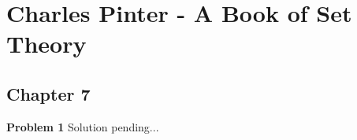\documentclass{article}
\begin{document}
\section*{Charles Pinter - A Book of Set Theory}
\subsection*{Chapter 7}

\textbf{Problem 1}
Solution pending...
\end{document}
